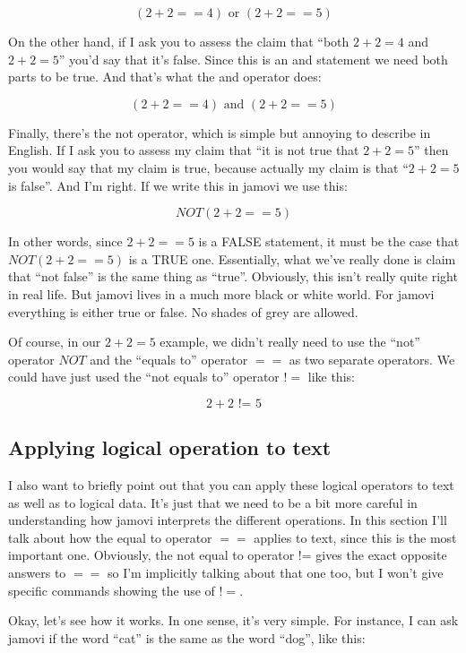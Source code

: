 \documentclass[
]{book}
\begin{document}
\[(2+2 == 4) \text{ or } (2+2 == 5)\]

On the other hand, if I ask you to assess the claim that ``both \(2 + 2 = 4\) and \(2 + 2 = 5\)'' you'd say that it's false. Since this is an and statement we need both parts to be true. And that's what the and operator does:

\[(2+2 == 4) \text{ and } (2+2 == 5)\]

Finally, there's the not operator, which is simple but annoying to describe in English. If I ask you to assess my claim that ``it is not true that \(2 + 2 = 5\)'' then you would say that my claim is true, because actually my claim is that ``\(2 + 2 = 5\) is false''. And I'm right. If we write this in jamovi we use this:

\[NOT(2+2 == 5)\]

In other words, since \(2+2 == 5\) is a FALSE statement, it must be the case that \(NOT(2+2 == 5)\) is a TRUE one. Essentially, what we've really done is claim that ``not false'' is the same thing as ``true''. Obviously, this isn't really quite right in real life. But jamovi lives in a much more black or white world. For jamovi everything is either true or false. No shades of grey are allowed.

Of course, in our \(2 + 2 = 5\) example, we didn't really need to use the ``not'' operator \(NOT\) and the ``equals to'' operator \(==\) as two separate operators. We could have just used the ``not equals to'' operator \(!=\) like this:

\[2+2 \text{ != } 5\]

\hypertarget{applying-logical-operation-to-text}{%
\subsection{Applying logical operation to text}\label{applying-logical-operation-to-text}}

I also want to briefly point out that you can apply these logical operators to text as well as to logical data. It's just that we need to be a bit more careful in understanding how jamovi interprets the different operations. In this section I'll talk about how the equal to operator \(==\) applies to text, since this is the most important one. Obviously, the not equal to operator != gives the exact opposite answers to \(==\) so I'm implicitly talking about that one too, but I won't give specific commands showing the use of \(!=\).

Okay, let's see how it works. In one sense, it's very simple. For instance, I can ask jamovi if the word ``cat'' is the same as the word ``dog'', like this:
\end{document}
